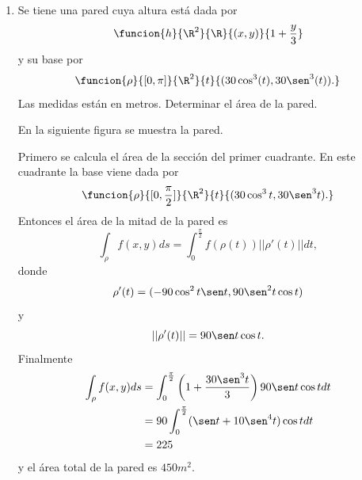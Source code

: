 \documentclass[a4,11pt]{aleph-examen}
\begin{document}
\begin{preguntas}
\begin{respuesta}
\begin{respuesta}
\begin{respuesta}
\begin{enumerate}
\begin{respuesta}
	 \[
    \begin{aligned}
     \bar{y}&=\dfrac{\int_C y \delta(x,y) ds}{m}\\
     &=\dfrac{\int_{C_1} y \delta(x,y) ds+\int_{C_2} y \delta(x,y) ds+\int_{C_3} y \delta(x,y) ds}{m}\\
     &=\dfrac{\int_{C_1} x^2y ds+\int_{C_2} x^2y ds+\int_{C_3} x^2y ds}{m}
     \\
     &=\dfrac{\int_{1}^{4} t^2(-3t+13) \l(\sqrt{10}\r) dt+\int_{-2}^{4} t^2 dt+\int_{-2}^{1} t^2(3t+7) \l(\sqrt{10}\r) dt}{m}\\
     &=\dfrac{81.75\sqrt{10}+24+9.75\sqrt{10}}{m}\\
     &=\dfrac{313}{100}\\
     &=3.13
    \end{aligned}
    \]
\end{respuesta}

\item
    Se tiene una pared cuya altura está dada por
    \[
        \funcion{h}{\R^2}{\R}{(x,y)}{1+\frac{y}{3}}
    \]
    y su base por
    \[
        \funcion{\rho}{[0,\pi]}{\R^2}{t}{(30\cos^3(t),30\sen^3(t)).}
    \]
    Las medidas están en metros. Determinar el área de la pared.  
    
\begin{respuesta}
    En la siguiente figura se muestra la pared.
        
    
   Primero se calcula el área de la sección del primer cuadrante. 
   En este cuadrante la base viene dada por 
   \[
        \funcion{\rho}{[0,\frac{\pi}{2}]}{\R^2}{t}{(30\cos^3t,30\sen^3t).}
    \]
   Entonces el área de la mitad de la pared es
   \[
        \int_{\rho}f(x,y)ds=\int_0^{\frac{\pi}{2}}f(\rho(t))||\rho'(t)||dt,
   \]
   donde 
   \[
    \rho'(t)=(-90\cos^2t\sen t,90\sen^2t\cos t)
   \]
   y
   \[
   ||\rho'(t)||=90\sen t\cos t.
   \]
   Finalmente
   \begin{align*}
   \int_{\rho}f(x,y)ds&=\int_0^{\frac{\pi}{2}}\left(1+\frac{30\sen^3t}{3} \right)90\sen t\cos tdt\\
   &=90\int_0^\frac{\pi}{2}(\sen t +10\sen^4t)\cos tdt\\
   &=225
   \end{align*}
   y el área total de la pared es $450m^2$.
\end{respuesta}


\end{enumerate}
\end{respuesta}
\end{respuesta}
\end{respuesta}
\end{preguntas}
\end{document}
